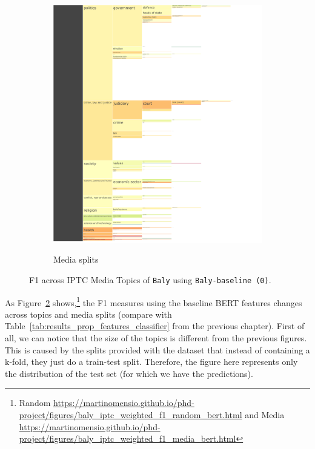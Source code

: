 \begin{figure}[!htbp]
\begin{subfigure}{0.49\textwidth}
    \href{https://martinomensio.github.io/phd-project/figures/baly_iptc_weighted_f1_media_bert.html}{\includegraphics[trim={2.65cm 0cm 0cm 0cm},clip,width=\linewidth]{figures/baly_iptc_weighted_f1_media_bert.pdf}}
    \caption{Media splits}
    \label{fig:baly_iptc_weighted_f1_media_bert}
\end{subfigure}
\caption{F1 across IPTC Media Topics of \texttt{Baly} using \texttt{Baly-baseline (0)}.}
    \label{fig:baly_iptc_weighted_f1_bert}
\end{figure}

As Figure~\ref{fig:baly_iptc_weighted_f1_bert} shows,\footnote{Random \url{https://martinomensio.github.io/phd-project/figures/baly_iptc_weighted_f1_random_bert.html} and Media \url{https://martinomensio.github.io/phd-project/figures/baly_iptc_weighted_f1_media_bert.html}} the F1 measures using the baseline BERT features changes across topics and media splits (compare with Table~\ref{tab:results_prop_features_classifier} from the previous chapter).
First of all, we can notice that the size of the topics is different from the previous figures. This is caused by the splits provided with the dataset that instead of containing a k-fold, they just do a train-test split. Therefore, the figure here represents only the distribution of the test set (for which we have the predictions).

